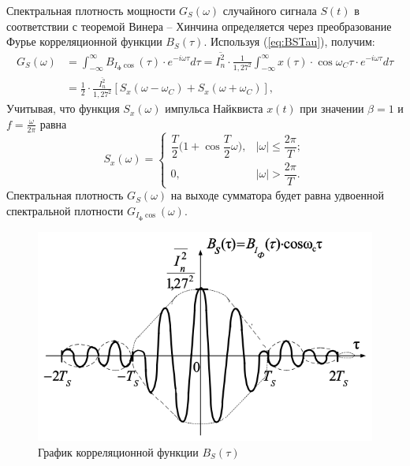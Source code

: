 \documentclass[a4paper, 12pt]{article}
\begin{document}
\begin{enumerate}
  Спектральная плотность мощности $G_S(\omega)$ случайного сигнала 
  $S(t)$ в соответствии с теоремой Винера -- Хинчина определяется 
  через преобразование Фурье корреляционной функции $B_S(\tau)$.
  Используя (\ref{eq:BSTau}), получим:
  \begin{equation}
    \begin{split}
      G_S(\omega)&=\int^\infty_{-\infty}B_{I_ф\cos}(\tau)
      \cdot e^{-i\omega\tau}d\tau
      =\overline{I^2_n}\cdot\frac{1}{1,27^2}
      \int^\infty_{-\infty}x(\tau)\cdot\cos\omega_C\tau
      \cdot e^{-i\omega\tau}d\tau\\
      &=\frac 12 \cdot \frac{\overline{I^2_n}}{1,27^2}
      [S_x(\omega-\omega_C)+S_x(\omega+\omega_C)],
    \end{split}
  \end{equation}
  Учитывая, что функция $S_x(\omega)$ импульса Найквиста $x(t)$
  при значении $\beta=1$ и $f=\frac{\omega}{2\pi}$ равна
  \begin{equation}
    S_x(\omega)=\begin{cases}
      \dfrac T2\biggr(1+\cos\dfrac T2\omega\biggr), 
      & |\omega|\leq\dfrac{2\pi}{T};\\[10pt]
      0, & |\omega|>\dfrac{2\pi}{T}.
    \end{cases}
  \end{equation}
  Спектральная плотность $G_S(\omega)$ на выходе сумматора будет 
  равна удвоенной спектральной плотности $G_{I_ф\cos}(\omega)$.

  \begin{figure}[H]
    \centering
    \includegraphics{BSTau}
    \caption{График корреляционной функции $B_S(\tau)$}
  \end{figure}


\end{enumerate}
\end{document}
